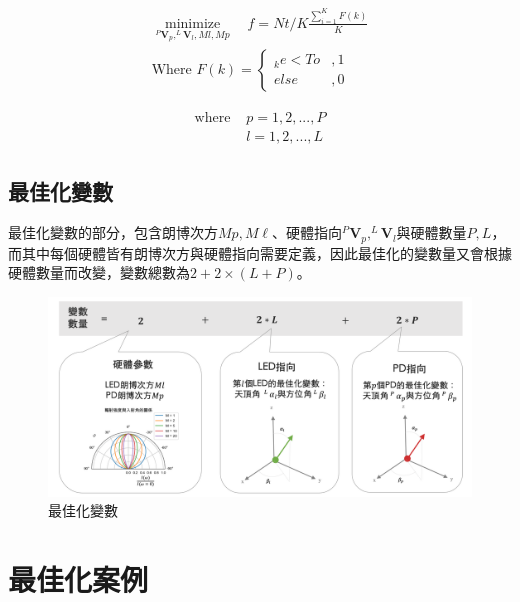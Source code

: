     \begin{equation}
        \label{eqn:objective}
        \begin{aligned}
        \underset{^{P}\boldsymbol{V}_p, ^{L}\boldsymbol{V}_l,Ml,Mp}{\operatorname{minimize}} 
        \quad f = Nt/K
        \frac{\sum_{i=1}^{K}F(k)}{K}  \\
        \text{Where }F(k)=
        \begin{cases}
            _{k}e<To&,1\\
            else&,0
        \end{cases}
        \end{aligned}
    \end{equation}

    \begin{align*} \text{where }
        &p=1,2,...,P\\&l=1,2,...,L
    \end{align*}


    \subsection{最佳化變數}
    \label{chp:optimize_variable}

    最佳化變數的部分，包含朗博次方$Mp,M\ell$、硬體指向$^{P}\boldsymbol{V}_p,^{L}\boldsymbol{V}_l$與硬體數量$P,L$，而其中每個硬體皆有朗博次方與硬體指向需要定義，因此最佳化的變數量又會根據硬體數量而改變，變數總數為$2+2\times(L+P)$。


    \begin{figure}[htpb]
        \centering
        \includegraphics[width=15cm]{ch5pic/optimize_variable.png}
        \caption{最佳化變數}
        \label{pic:optimize_variable}
    \end{figure}



\section{最佳化案例}
\label{chp:optimize_case}

